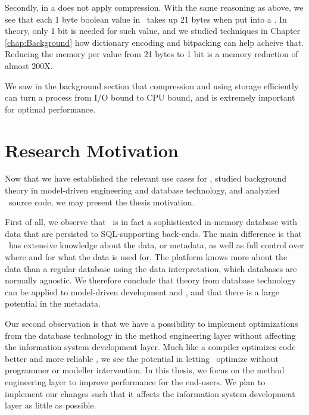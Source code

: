 Secondly,  in a  does not apply compression. With the same reasoning as above, we see that each 1 byte boolean value in \gap~takes up 21 bytes when put into a . In theory, only 1 bit is needed for such value, and we studied techniques in Chapter \ref{chap:Background} how dictionary encoding and bitpacking can help acheive that. Reducing the memory per value from 21 bytes to 1 bit is a memory reduction of almost 200X.

We saw in the background section that compression and using storage efficiently can turn a process from I/O bound to CPU bound, and is extremely important for optimal performance.

\section{Research Motivation}
\label{sec:Research Motivation}
Now that we have established the relevant use cases for \genus, studied background theory in model-driven engineering and database technology, and analyzied \gap~source code, we may present the thesis motivation.

First of all, we observe that \gap~is in fact a sophisticated in-memory database with data that are persisted to SQL-supporting back-ends. The main difference is that \gap~has extensive knowledge about the data, or metadata, as well as full control over where and for what the data is used for. The platform knows more about the data than a regular database using the data interpretation, which databases are normally agnostic. We therefore conclude that theory from database technology can be applied to model-driven development and \gap, and that there is a large potential in the metadata.


Our second observation is that we have a possibility to implement optimizations from the database technology in the method engineering layer without affecting the information system development layer. Much like a compiler optimizes code better and more reliable \cite{Selic2003-qa}, we see the potential in letting \gap~optimize without programmer or modeller intervention. In this thesis, we focus on the method engineering layer to improve performance for the end-users. We plan to implement our changes such that it affects the information system development layer as little as possible.
